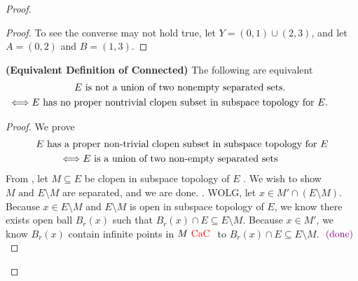 \documentclass{report}
\begin{document}
\begin{proof}
\begin{proof}
To see the converse may not hold true, let $Y=(0,1)\cup (2,3)$, and let $A=(0,2)$ and $B=(1,3)$. 
\end{proof}
\begin{theorem}
\label{1.4.4}
\textbf{(Equivalent Definition of Connected)} The following are equivalent
\begin{gather}
E\text{ is not a union of two nonempty separated sets. }\\
\liff E\text{ has no proper nontrivial clopen subset in subspace topology for $E$. }
\end{gather}
\end{theorem}
\begin{proof}
We prove
\begin{gather}
E\text{ has a proper non-trivial clopen subset in subspace topology for $E$}\\
\liff E\text{ is a union of two non-empty separated sets }
\end{gather}
From , let $M\subseteq E$ be clopen in subspace topology of $E$ . We wish to show $M\text{ and }E\setminus M$ are separated, and we are done. . WOLG, let $x\in M'\cap (E\setminus M)$.\\

 Because  $x\in E\setminus M$ and $E\setminus M$ is open in subspace topology of $E$, we know there exists open ball $B_r(x)$ such that $B_r(x)\cap E\subseteq E\setminus M$. Because  $x\in M'$, we know $B_r(x)$ contain infinite points in $M\text{ \textcolor{red}{CaC} }$ to $B_r(x)\cap E\subseteq E\setminus M$. $\textcolor{violet}{\text{ (done) }}$\\



\end{proof}
\end{proof}
\end{document}
